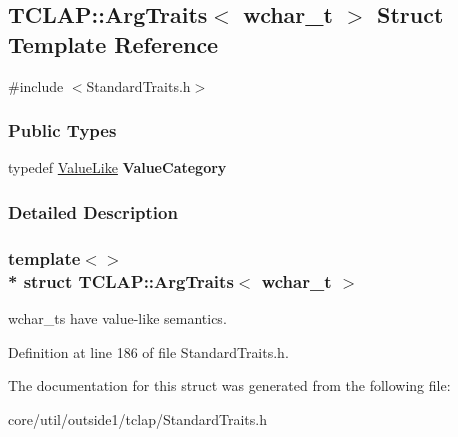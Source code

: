 \hypertarget{structTCLAP_1_1ArgTraits_3_01wchar__t_01_4}{}\subsection{T\+C\+L\+AP\+:\+:Arg\+Traits$<$ wchar\+\_\+t $>$ Struct Template Reference}
\label{structTCLAP_1_1ArgTraits_3_01wchar__t_01_4}


{\ttfamily \#include $<$Standard\+Traits.\+h$>$}

\subsubsection*{Public Types}
\begin{DoxyCompactItemize}
\item 
typedef \hyperlink{structTCLAP_1_1ValueLike}{Value\+Like} {\bfseries Value\+Category}\hypertarget{structTCLAP_1_1ArgTraits_3_01wchar__t_01_4_a49a311297a394637af4d8d64eda7f442}{}\label{structTCLAP_1_1ArgTraits_3_01wchar__t_01_4_a49a311297a394637af4d8d64eda7f442}

\end{DoxyCompactItemize}


\subsubsection{Detailed Description}
\subsubsection*{template$<$$>$\\*
struct T\+C\+L\+A\+P\+::\+Arg\+Traits$<$ wchar\+\_\+t $>$}

wchar\+\_\+ts have value-\/like semantics. 

Definition at line 186 of file Standard\+Traits.\+h.



The documentation for this struct was generated from the following file\+:\begin{DoxyCompactItemize}
\item 
core/util/outside1/tclap/Standard\+Traits.\+h\end{DoxyCompactItemize}
